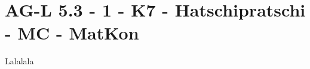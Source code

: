 \section{AG-L 5.3 - 1 - K7 - Hatschipratschi - MC - MatKon}

\begin{beispiel}[AG-L 5.3]{1}
Lalalala
\end{beispiel}
